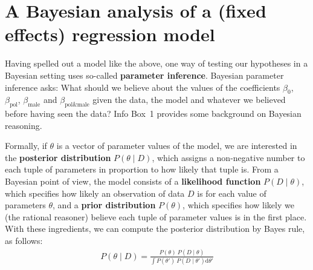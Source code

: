 \documentclass[nobib]{tufte-handout}
\begin{document}
\section{A Bayesian analysis of a (fixed effects) regression model}

Having spelled out a model like the above, one way of testing our hypotheses in a Bayesian setting uses so-called \textbf{parameter inference}.
%
%
Bayesian parameter inference asks: What should we believe about the values of the coefficients $\beta_0$, $\beta_{\text{pol}}$, $\beta_{\text{male}}$ and $\beta_{\text{pol\&male}}$ given the data, the model and whatever we believed before having seen the data? Info Box~1 provides some background on Bayesian reasoning.


Formally, if $\theta$ is a vector of parameter values of the model, we are interested in the \textbf{posterior distribution} $P(\theta \mid D)$, which assigns a non-negative number to each tuple of parameters in proportion to how likely that tuple is.
From a Bayesian point of view, the model consists of a \textbf{likelihood function} $P(D \mid \theta)$, which specifies how likely an observation of data $D$ is for each value of parameters $\theta$, and a \textbf{prior distribution} $P(\theta)$, which specifies how likely we (the rational reasoner) believe each tuple of parameter values is in the first place.
%
%
With these ingredients, we can compute the posterior distribution by Bayes rule, as follows:
\begin{eqnarray*}
  P(\theta \mid D) = \frac{P(\theta) \ P(D \mid \theta)}{ \int P(\theta') \ P(D \mid
  \theta') \textrm{d}\theta'}
\end{eqnarray*}

\end{document}
